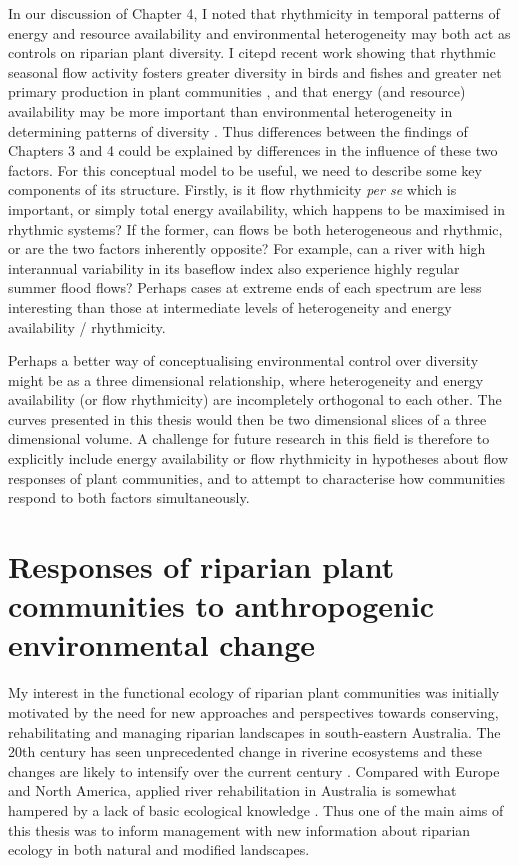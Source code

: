 \documentclass[openright,12pt,a4paper]{memoir}
\begin{document}
{{In our discussion of Chapter 4, I noted that rhythmicity in temporal patterns of energy and resource availability and environmental heterogeneity may both act as controls on riparian plant diversity. I citepd recent work showing that rhythmic seasonal flow activity fosters greater diversity in birds and fishes and greater net primary production in plant communities \citep{Jardine2015}, and that energy (and resource) availability may be more important than environmental heterogeneity in determining patterns of diversity \citep{Lundholm2009}. Thus differences between the findings of Chapters 3 and 4 could be explained by differences in the influence of these two factors. For this conceptual model to be useful, we need to describe some key components of its structure. Firstly, is it flow rhythmicity \textit{per se} which is important, or simply total energy availability, which happens to be maximised in rhythmic systems? If the former, can flows be both heterogeneous and rhythmic, or are the two factors inherently opposite? For example, can a river with high interannual variability in its baseflow index also experience highly regular summer flood flows? Perhaps cases at extreme ends of each spectrum are less interesting than those at intermediate levels of heterogeneity and energy availability / rhythmicity.
 
Perhaps a better way of conceptualising environmental control over diversity might be as a three dimensional relationship, where heterogeneity and energy availability (or flow rhythmicity) are incompletely orthogonal to each other. The curves presented in this thesis would then be two dimensional slices of a three dimensional volume. A challenge for future research in this field is therefore to explicitly include energy availability or flow rhythmicity in hypotheses about flow responses of plant communities, and to attempt to characterise how communities respond to both factors simultaneously.

\section{Responses of riparian plant communities to anthropogenic environmental change}
My interest in the functional ecology of riparian plant communities was initially motivated by the need for new approaches and perspectives towards conserving, rehabilitating and managing riparian landscapes in south-eastern Australia. The 20th century has seen unprecedented change in riverine ecosystems and these changes are likely to intensify over the current century \citep{Nilsson2000, Hennessy2008}. Compared with Europe and North America, applied river rehabilitation in Australia is somewhat hampered by a lack of basic ecological knowledge \citep{Brooks2007}. Thus one of the main aims of this thesis was to inform management with new information about riparian ecology in both natural and modified landscapes.

}}
\end{document}
